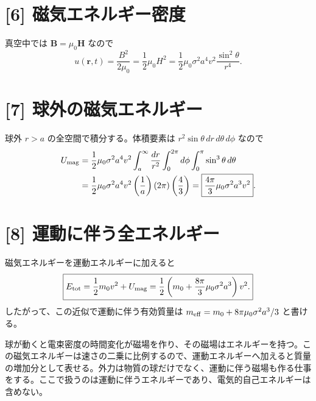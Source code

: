 \documentclass[11pt,a4paper]{article}
\begin{document}
\section*{[6] 磁気エネルギー密度}
真空中では $\boldsymbol B=\mu_0\boldsymbol H$ なので
\begin{equation}
 \boxed{u(\boldsymbol r,t)=\frac{B^2}{2\mu_0}
 =\frac12\mu_0H^2
 =\frac12\mu_0\sigma^2a^4v^2\frac{\sin^2\theta}{r^4}.}
\end{equation}

\section*{[7] 球外の磁気エネルギー}
球外 $r>a$ の全空間で積分する。体積要素は $r^2\sin\theta\,dr\,d\theta\,d\phi$ なので
\begin{align}
 U_{\rm mag}
 &=\frac12\mu_0\sigma^2a^4v^2
   \int_a^\infty\frac{dr}{r^2}
   \int_0^{2\pi}d\phi\int_0^\pi\sin^3\theta\,d\theta\\
 &=\frac12\mu_0\sigma^2a^4v^2\left(\frac1a\right)(2\pi)\left(\frac43\right)
 =\boxed{\frac{4\pi}{3}\mu_0\sigma^2a^3v^2}.
\end{align}

\section*{[8] 運動に伴う全エネルギー}
磁気エネルギーを運動エネルギーに加えると
\begin{equation}
 \boxed{E_{\rm tot}=\frac12m_0v^2+U_{\rm mag}
 =\frac12\left(m_0+\frac{8\pi}{3}\mu_0\sigma^2a^3\right)v^2.}
\end{equation}
したがって、この近似で運動に伴う有効質量は
$m_{\rm eff}=m_0+8\pi\mu_0\sigma^2a^3/3$ と書ける。

球が動くと電束密度の時間変化が磁場を作り、その磁場はエネルギーを持つ。この磁気エネルギーは速さの二乗に比例するので、運動エネルギーへ加えると質量の増加分として表せる。外力は物質の球だけでなく、運動に伴う磁場も作る仕事をする。ここで扱うのは運動に伴うエネルギーであり、電気的自己エネルギーは含めない。
\end{document}
